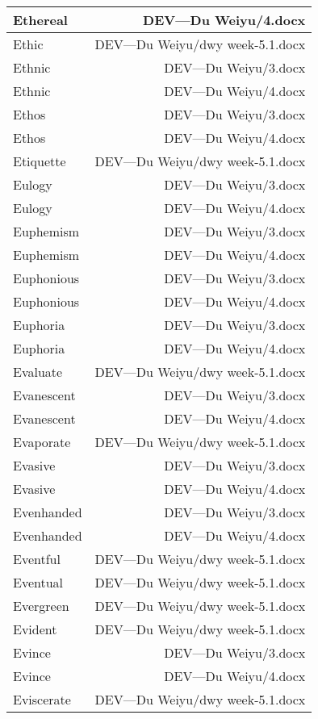 \documentclass{article}
\begin{document}
\begin{center}
\begin{longtable}{|l|r|}
Ethereal  &  DEV---Du Weiyu/4.docx\\  
\hline
Ethic  &  DEV---Du Weiyu/dwy week-5.1.docx\\  
\hline
Ethnic  &  DEV---Du Weiyu/3.docx\\  
\hline
Ethnic  &  DEV---Du Weiyu/4.docx\\  
\hline
Ethos  &  DEV---Du Weiyu/3.docx\\  
\hline
Ethos  &  DEV---Du Weiyu/4.docx\\  
\hline
Etiquette  &  DEV---Du Weiyu/dwy week-5.1.docx\\  
\hline
Eulogy  &  DEV---Du Weiyu/3.docx\\  
\hline
Eulogy  &  DEV---Du Weiyu/4.docx\\  
\hline
Euphemism  &  DEV---Du Weiyu/3.docx\\  
\hline
Euphemism  &  DEV---Du Weiyu/4.docx\\  
\hline
Euphonious  &  DEV---Du Weiyu/3.docx\\  
\hline
Euphonious  &  DEV---Du Weiyu/4.docx\\  
\hline
Euphoria  &  DEV---Du Weiyu/3.docx\\  
\hline
Euphoria  &  DEV---Du Weiyu/4.docx\\  
\hline
Evaluate  &  DEV---Du Weiyu/dwy week-5.1.docx\\  
\hline
Evanescent  &  DEV---Du Weiyu/3.docx\\  
\hline
Evanescent  &  DEV---Du Weiyu/4.docx\\  
\hline
Evaporate  &  DEV---Du Weiyu/dwy week-5.1.docx\\  
\hline
Evasive  &  DEV---Du Weiyu/3.docx\\  
\hline
Evasive  &  DEV---Du Weiyu/4.docx\\  
\hline
Evenhanded  &  DEV---Du Weiyu/3.docx\\  
\hline
Evenhanded  &  DEV---Du Weiyu/4.docx\\  
\hline
Eventful  &  DEV---Du Weiyu/dwy week-5.1.docx\\  
\hline
Eventual  &  DEV---Du Weiyu/dwy week-5.1.docx\\  
\hline
Evergreen  &  DEV---Du Weiyu/dwy week-5.1.docx\\  
\hline
Evident  &  DEV---Du Weiyu/dwy week-5.1.docx\\  
\hline
Evince  &  DEV---Du Weiyu/3.docx\\  
\hline
Evince  &  DEV---Du Weiyu/4.docx\\  
\hline
Eviscerate  &  DEV---Du Weiyu/dwy week-5.1.docx\\  

\end{longtable}
\end{center}
\end{document}
